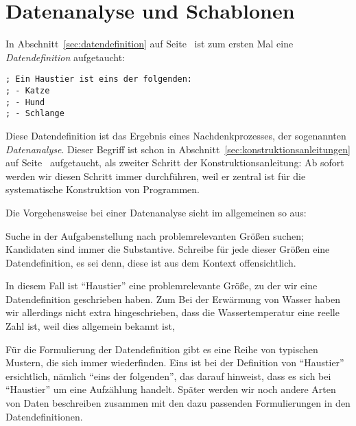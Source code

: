 \section{Datenanalyse und Schablonen}
\label{sec:datenanalyse}

In Abschnitt~\ref{sec:datendefinition} auf
Seite~\pageref{sec:datendefinition} ist zum ersten Mal eine
\textit{Datendefinition} aufgetaucht:
%
\begin{verbatim}
; Ein Haustier ist eins der folgenden:
; - Katze
; - Hund
; - Schlange
\end{verbatim}
%
Diese Datendefinition ist das Ergebnis eines Nachdenkprozesses, der
sogenannten \textit{Datenanalyse}.  Dieser Begriff
ist schon in Abschnitt~\ref{sec:konstruktionsanleitungen} auf
Seite~\pageref{sec:konstruktionsanleitungen} aufgetaucht, als zweiter
Schritt der Konstruktionsanleitung: Ab sofort werden wir diesen
Schritt immer durchführen, weil er zentral ist für die systematische
Konstruktion von Programmen.

Die Vorgehensweise bei einer Datenanalyse sieht im allgemeinen so aus:
%
\begin{konstruktionsanleitung}[Datenanalyse]
  Suche in der Aufgabenstellung nach problemrelevanten Größen suchen;
  Kandidaten sind immer die Substantive. Schreibe für jede dieser
  Größen eine Datendefinition, es sei denn, diese ist aus dem Kontext
  offensichtlich.
\end{konstruktionsanleitung}
%
In diesem Fall ist "`Haustier"' eine problemrelevante Größe, zu der
wir eine Datendefinition geschrieben haben.  Zum Bei der Erwärmung von
Wasser haben wir allerdings nicht extra hingeschrieben, dass die
Wassertemperatur eine reelle Zahl ist, weil dies allgemein bekannt
ist,

Für die Formulierung der Datendefinition gibt es eine Reihe von
typischen Mustern, die sich immer wiederfinden.  Eins ist bei der
Definition von "`Haustier"' ersichtlich, nämlich "`eins der
folgenden"', das darauf hinweist, dass es sich bei "`Haustier"' um
eine Aufzählung handelt.  Später werden wir noch andere Arten
von Daten beschreiben zusammen mit den dazu passenden Formulierungen
in den Datendefinitionen.


